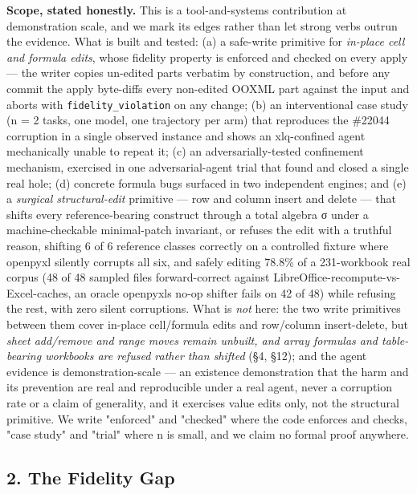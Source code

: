 \documentclass[
]{article}
\begin{document}
\textbf{Scope, stated honestly.} This is a tool-and-systems contribution
at demonstration scale, and we mark its edges rather than let strong
verbs outrun the evidence. What is built and tested: (a) a safe-write
primitive for \emph{in-place cell and formula edits}, whose fidelity
property is enforced and checked on every apply --- the writer copies
un-edited parts verbatim by construction, and before any commit the
apply byte-diffs every non-edited OOXML part against the input and
aborts with \texttt{fidelity\_violation} on any change; (b) an
interventional case study (n = 2 tasks, one model, one trajectory per
arm) that reproduces the \#22044 corruption in a single observed
instance and shows an xlq-confined agent mechanically unable to repeat
it; (c) an adversarially-tested confinement mechanism, exercised in one
adversarial-agent trial that found and closed a single real hole; (d)
concrete formula bugs surfaced in two independent engines; and (e) a
\emph{surgical structural-edit} primitive --- row and column insert and
delete --- that shifts every reference-bearing construct through a total
algebra σ under a machine-checkable minimal-patch invariant, or refuses
the edit with a truthful reason, shifting 6 of 6 reference classes
correctly on a controlled fixture where openpyxl silently corrupts all
six, and safely editing 78.8\% of a 231-workbook real corpus (48 of 48
sampled files forward-correct against
LibreOffice-recompute-vs-Excel-caches, an oracle
openpyxl\textquotesingle s no-op shifter fails on 42 of 48) while
refusing the rest, with zero silent corruptions. What is \emph{not}
here: the two write primitives between them cover in-place cell/formula
edits and row/column insert-delete, but \emph{sheet add/remove and range
moves remain unbuilt, and array formulas and table-bearing workbooks are
refused rather than shifted} (§4, §12); and the agent evidence is
demonstration-scale --- an existence demonstration that the harm and its
prevention are real and reproducible under a real agent, never a
corruption rate or a claim of generality, and it exercises value edits
only, not the structural primitive. We write "enforced" and "checked"
where the code enforces and checks, "case study" and "trial" where n is
small, and we claim no formal proof anywhere.

\subsection{2. The Fidelity Gap}\label{2-the-fidelity-gap}
\end{document}

